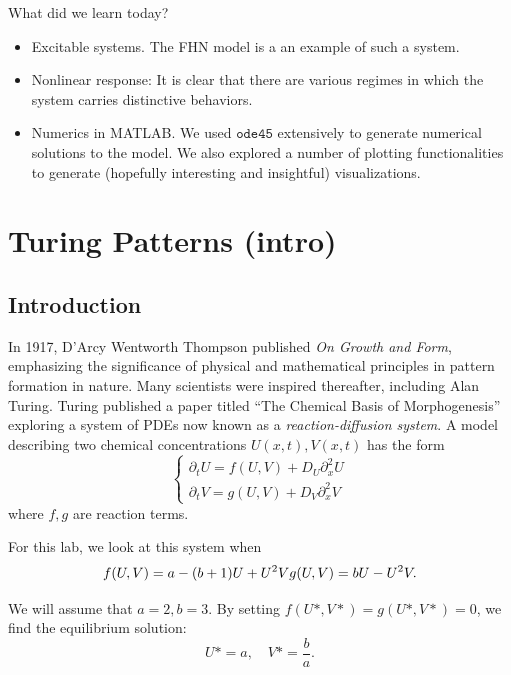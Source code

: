 \documentclass{book}
\theoremstyle{definition}
\newcommand{\p}{\partial}
\newcommand{\f}[2]{\frac{#1}{#2}}
\begin{document}
What did we learn today? 
\begin{itemize}
	\item Excitable systems. The FHN model is a an example of such a system.
	\item Nonlinear response: It is clear that there are various regimes in which the system carries distinctive behaviors. 
	\item Numerics in MATLAB. We used $\texttt{ode45}$ extensively to generate numerical solutions to the model. We also explored a number of plotting functionalities to generate (hopefully interesting and insightful)  visualizations.
\end{itemize}




\newpage
 

\chapter{Turing Patterns (intro)}



\section{Introduction}

In 1917, D'Arcy Wentworth Thompson published \textit{On Growth and Form}, emphasizing the significance of physical and mathematical principles in pattern formation in nature. Many scientists were inspired thereafter, including Alan Turing. Turing published a paper titled ``The Chemical Basis of Morphogenesis'' exploring a system of PDEs now known as a \textit{reaction-diffusion system}. A model describing two chemical concentrations $U(x,t), V(x,t)$ has the form
\begin{equation*}
\begin{cases}
\p_t U  = f(U,V)  + D_U \p_x^2 U \\ 
\p_t V  = g(U,V)  + D_V \p_x^2 V 
\end{cases}
\end{equation*}   
where $f,g$ are reaction terms. 


For this lab, we look at this system when 
\begin{equation*}
f(U,V) = a - (b+1)U + U^2V \\
g(U,V) = bU - U^2V.
\end{equation*}

We will assume that $a=2,b=3$. By setting $f(U*, V*) = g(U*,V*) =  0 $, we find the equilibrium solution:
\begin{equation*}
U* = a, \quad V* = \f{b}{a}.
\end{equation*}
\end{document}
